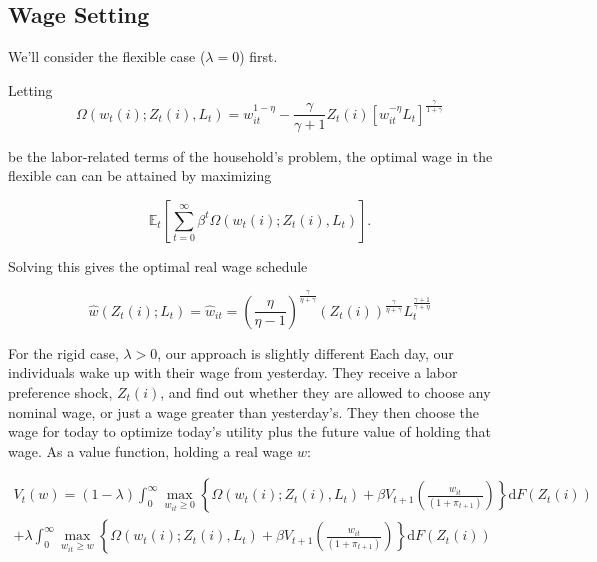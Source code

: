 \documentclass[12pt,a4paper]{scrartcl}            %
\begin{document}
\subsection{Wage Setting}
\label{sub:wage_setting}

We'll consider the flexible case ($\lambda = 0$) first.

Letting
\begin{equation}
    \label{eq:labor_part}
    \Omega( w_t(i); Z_t(i), L_t ) = w_{it}^{1 - \eta} - \frac{\gamma}{\gamma + 1}Z_t(i)\left[ w_{it}^{-\eta}L_t \right]^{\frac{\gamma}{1 + \gamma}}
\end{equation}

be the labor-related terms of the household's problem, the optimal wage in the flexible can can be attained by maximizing

\begin{equation}
    \label{eq:labor_opt}
    \mathbb{E}_t\left[\sum_{t=0}^{\infty}\beta^t \Omega( w_t(i); Z_t(i), L_t ) \right].
\end{equation}

Solving this gives the optimal real wage schedule

\begin{equation}
    \label{eq:flex}
    \hat{w}(Z_t(i); L_t) = \hat{w}_{it} = \left( \frac{\eta}{\eta - 1} \right)^{\frac{\gamma}{\eta + \gamma}}\left( Z_t(i) \right)^{\frac{\gamma}{\eta + \gamma}} L_t^{\frac{\gamma + 1}{\gamma + \eta}}
\end{equation}

For the rigid case, $\lambda > 0$, our approach is slightly different
Each day, our individuals wake up with their wage from yesterday.
They receive a labor preference shock, $Z_t(i)$, and find out whether they are allowed to choose any nominal wage, or just a wage greater than yesterday's.
They then choose the wage for today to optimize today's utility plus the future value of holding that wage.
As a value function, holding a real wage $w$:

\begin{multline}
    \label{eq:value_function}
    V_t(w) = (1 - \lambda) \int_{0}^{\infty} \max_{w_{it} \geq 0} \left\{ \Omega( w_t(i); Z_t(i), L_t ) + \beta V_{t+1}\left( \frac{w_{it}}{(1 + \pi_{t+1})} \right) \right\} \mathrm{d}F(Z_t(i)) \\
                + \lambda  \int_{0}^{\infty} \max_{w_{it} \geq w} \left\{ \Omega( w_t(i); Z_t(i), L_t ) + \beta V_{t+1}\left( \frac{w_{it}}{(1 + \pi_{t+1})} \right) \right\} \mathrm{d}F(Z_t(i))
\end{multline}
\end{document}
